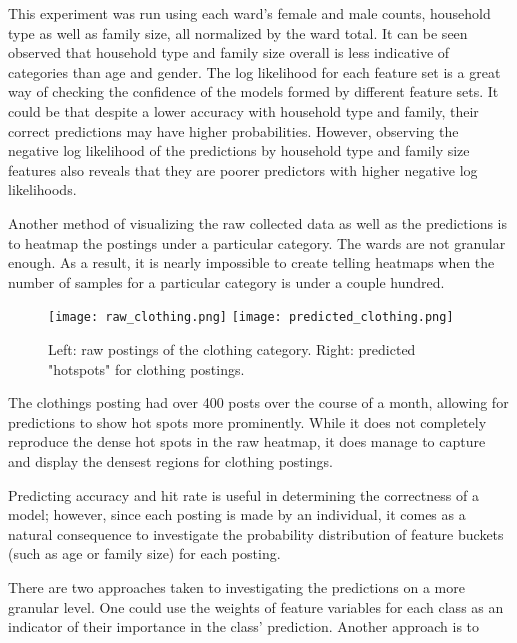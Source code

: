 \documentclass[12pt]{article}
\begin{document}
This experiment was run using each ward's female and male counts, household type as well as family size, all normalized by the ward total. 
It can be seen observed that household type and family size overall is less indicative of categories than age and gender. The log likelihood for each feature set is a great way of checking the confidence of the models formed by different feature sets. It could be that despite a lower accuracy with household type and family, their correct predictions may have higher probabilities. However, observing the negative log likelihood of the predictions by household type and family size features also reveals that they are poorer predictors with higher negative log likelihoods.

Another method of visualizing the raw collected data as well as the predictions is to heatmap the postings under a particular category.   
The wards are not granular enough. As a result, it is nearly impossible to create telling heatmaps when the number of samples for a particular category is under a couple hundred. 

\begin{figure}[h]
\centering
\texttt{[image: raw\_clothing.png]}
\texttt{[image: predicted\_clothing.png]}
\caption{Left: raw postings of the clothing category. Right: predicted "hotspots" for clothing postings.}
\end{figure}

The clothings posting had over 400 posts over the course of a month, allowing for predictions to show hot spots more prominently. While it does not completely reproduce the dense hot spots in the raw heatmap, it does manage to capture and display the densest regions for clothing postings. 

Predicting accuracy and hit rate is useful in determining the correctness of a model; however, since each posting is made by an individual, it comes as a natural consequence to investigate the probability distribution of feature buckets (such as age or family size) for each posting. 

There are two approaches taken to investigating the predictions on a more granular level. One could use the weights of feature variables for each class as an indicator of their importance in the class' prediction. Another approach is to 
\end{document}
